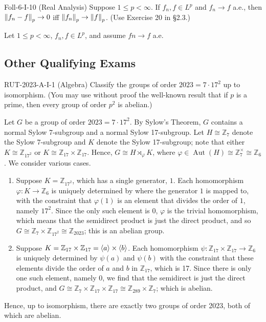 \documentclass{article}
\begin{document}
\begin{prb}{Foll-6-I-10 (Real Analysis)}
	Suppose $1 \leq p < \infty$. If $f_{n}, f \in L^{p}$ and $f_{n} \to f$ a.e., then $\left\Vert f_{n} - f \right\Vert_{p} \to 0$ iff $\left\Vert f_{n} \right\Vert_{p} \to \left\Vert f \right\Vert_{p}$. (Use Exercise 20 in \S2.3.)
\end{prb}
\begin{solutions} 
	Let $1 \leq p < \infty$, $f_{n}, f \in L^{p}$, and assume $f{n} \to f$ a.e. 
\end{solutions}

\newpage 
\subsection{Other Qualifying Exams}
\begin{prb}{RUT-2023-A-I-1 (Algebra)}
	Classify the groups of order $2023 = 7 \cdot 17^{2}$ up to isomorphism. (You may use without proof the well-known result that if $p$ is a prime, then every group of order $p^{2}$ is abelian.)
\end{prb}
\begin{solutions}
	Let $G$ be a group of order $2023 = 7 \cdot 17^{2}$. By Sylow's Theorem, $G$ contains a normal Sylow 7-subgroup and a normal Sylow 17-subgroup. Let $H \cong \mathbb{Z}_{7}$ denote the Sylow 7-subgroup and $K$ denote the Sylow 17-subgroup; note that either $K \cong \mathbb{Z}_{17^{2}}$ or $K \cong \mathbb{Z}_{17} \times \mathbb{Z}_{17}$. Hence, $G \cong H \rtimes_{\varphi} K$, where $\varphi \in \operatorname{Aut}(H) \cong \mathbb{Z}_{7}^{\times} \cong \mathbb{Z}_{6}$. We consider various cases. 
		\begin{enumerate}[itemsep =-2pt,label = (\Roman{*})]
			\item Suppose $K = \mathbb{Z}_{17^{2}}$, which has a single generator, $1$. Each homomorphism $\varphi: K \to \mathbb{Z}_{6}$ is uniquely determined by where the generator $1$ is mapped to, with the constraint that $\varphi(1)$ is an element that divides the order of $1$, namely $17^{2}$. Since the only such element is $0$, $\varphi$ is the trivial homomorphism, which means that the semidirect product is just the direct product, and so $G \cong \mathbb{Z}_{7} \times \mathbb{Z}_{17^{2}} \cong \mathbb{Z}_{2023}$; this is an abelian group. 
			\item Suppose $K = \mathbb{Z}_{17} \times \mathbb{Z}_{17} = \braket{a} \times \braket{b}$. Each homomorphism $\psi: \mathbb{Z}_{17} \times \mathbb{Z}_{17} \to \mathbb{Z}_{6}$ is uniquely determined by $\psi(a)$ and $\psi(b)$ with the constraint that these elements divide the order of $a$ and $b$ in $\mathbb{Z}_{17}$, which is 17. Since there is only one such element, namely 0, we find that the semidirect is just the direct product, and $G \cong \mathbb{Z}_{7} \times \mathbb{Z}_{17} \times \mathbb{Z}_{17} \cong \mathbb{Z}_{289} \times \mathbb{Z}_{7}$; which is abelian. 
		\end{enumerate}
	Hence, up to isomorphism, there are exactly two groups of order 2023, both of which are abelian. 
\end{solutions}
\end{document}
